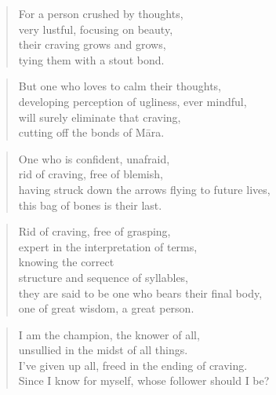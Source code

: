 \documentclass[12pt,openany]{book}%
\begin{document}
\begin{verse}%
For a person crushed by thoughts, \\
very lustful, focusing on beauty, \\
their craving grows and grows, \\
tying them with a stout bond. 

%
\end{verse}

\begin{verse}%
But one who loves to calm their thoughts, \\
developing perception of ugliness, ever mindful, \\
will surely eliminate that craving, \\
cutting off the bonds of \textsanskrit{Māra}. 

%
\end{verse}

\begin{verse}%
One who is confident, unafraid, \\
rid of craving, free of blemish, \\
having struck down the arrows flying to future lives, \\
this bag of bones is their last. 

%
\end{verse}

\begin{verse}%
Rid of craving, free of grasping, \\
expert in the interpretation of terms, \\
knowing the correct \\
structure and sequence of syllables, \\
they are said to be one who bears their final body, \\
one of great wisdom, a great person. 

%
\end{verse}

\begin{verse}%
I am the champion, the knower of all, \\
unsullied in the midst of all things. \\
I’ve given up all, freed in the ending of craving. \\
Since I know for myself, whose follower should I be? 

%
\end{verse}
\end{document}
